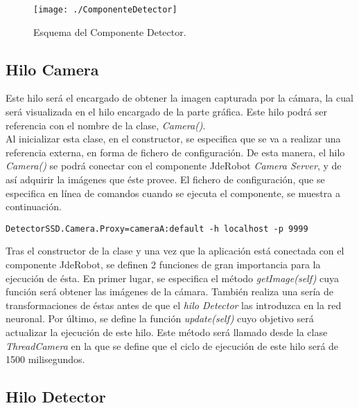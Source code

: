 \documentclass[a4paper, 12pt, spanish, chapterprefix, numbers=noenddot]{book}
\begin{document}
\begin{figure}[H]
\begin{center}
\texttt{[image: ./ComponenteDetector]}
\caption{Esquema del Componente Detector.}
\label{ComponenteDetector}
\end{center}
\end{figure}

\subsection{Hilo Camera}

Este hilo será el encargado de obtener la imagen capturada por la cámara, la cual será visualizada en el hilo encargado de la parte gráfica. Este hilo podrá ser referencia con el nombre de la clase, \textit{Camera()}.\\

Al inicializar esta clase, en el constructor, se especifica que se va a realizar una referencia externa, en forma de fichero de configuración. De esta manera, el hilo \textit{Camera()} se podrá conectar con el componente JdeRobot \textit{Camera Server}, y de así adquirir la imágenes que éste provee. El fichero de configuración, que se especifica en línea de comandos cuando se ejecuta el componente, se muestra a continuación.\\

\begin{lstlisting}[frame=single]
DetectorSSD.Camera.Proxy=cameraA:default -h localhost -p 9999
\end{lstlisting}

Tras el constructor de la clase y una vez que la aplicación está conectada con el componente JdeRobot, se definen 2 funciones de gran importancia para la ejecución de ésta. En primer lugar, se especifica el método \textit{getImage(self)} cuya función será obtener las imágenes de la cámara. También realiza una sería de transformaciones de éstas antes de que el \textit{hilo Detector} las introduzca en la red neuronal. Por último, se define la función \textit{update(self)} cuyo objetivo será actualizar la ejecución de este hilo. Este método será llamado desde la clase \textit{ThreadCamera} en la que se define que el ciclo de ejecución de este hilo será de 1500 milisegundos.

\subsection{Hilo Detector}
\end{document}
